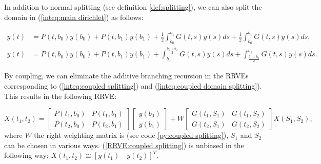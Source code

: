 \documentclass[a4paper,12pt]{article}
\begin{document}
\begin{example} \label{ex:coupled splitting}
    In addition to normal splitting (see definition \ref{def:splitting}),
    we can also split the domain in (\ref{inteq:main dirichlet})
    as follows:

    \begin{align}\label{inteq:coupled splitting}
        y(t) & = P(t,b_{0}) y(b_{0}) + P(t,b_{1}) y(b_{1}) +
        \frac{1}{2} \int_{b_{0}}^{b_{1}} G(t,s)y(s) ds +
        \frac{1}{2} \int_{b_{0}}^{b_{1}} G(t,s)y(s) ds,                                             \\
        y(t) & = P(t,b_{0}) y(b_{0}) + P(t,b_{1}) y(b_{1}) + \label{inteq:coupled domain splitting}
        \int_{b_{0}}^{\frac{b_{1}+b_{0}}{2}} G(t,s)y(s) ds +
        \int_{\frac{b_{1}+b_{0}}{2}}^{b_{1}} G(t,s)y(s) ds.
    \end{align}

    By coupling, we can eliminate the additive branching recursion
    in the RRVEs corresponding to (\ref{inteq:coupled splitting})
    and (\ref{inteq:coupled domain splitting}).
    This results in the following RRVE:

    \begin{equation} \label{RRVE:coupled splitting}
        X(t_{1},t_{2})=
        \begin{bmatrix}
            P(t_{1},b_{0}) & P(t_{1},b_{1}) \\
            P(t_{2},b_{0}) & P(t_{2},b_{1})
        \end{bmatrix}
        \begin{bmatrix}
            y(b_{0}) \\
            y(b_{1})
        \end{bmatrix}
        +
        W
        \begin{bmatrix}
            G(t_{1},S_{1}) & G(t_{1},S_{2}) \\
            G(t_{2},S_{1}) & G(t_{2},S_{2})
        \end{bmatrix}
        X(S_{1},S_{2}),
    \end{equation}
    where $W$ the right weighting matrix is
    (see code \ref{py:coupled splitting}),
    $S_{1}$ and $S_{2}$ can be chosen
    in various ways. (\ref{RRVE:coupled splitting}) is unbiased in the following way:
    $X(t_{1},t_{2}) \cong [y(t_{1}) \quad y(t_{2})]^{T}$.

\end{example}
\end{document}
